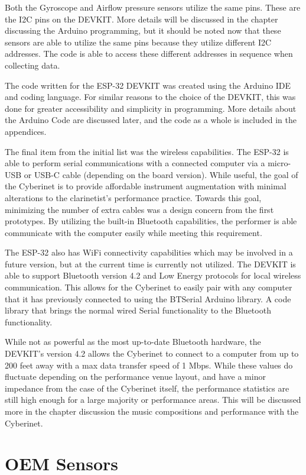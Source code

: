 Both the Gyroscope and Airflow pressure sensors utilize the same pins. These are the I2C pins on the DEVKIT. More details will be discussed in the chapter discussing the Arduino programming, but it should be noted now that these sensors are able to utilize the same pins because they utilize different I2C addresses. The code is able to access these different addresses in sequence when collecting data.

The code written for the ESP-32 DEVKIT was created using the Arduino IDE and coding language. For similar reasons to the choice of the DEVKIT, this was done for greater accessibility and simplicity in programming. More details about the Arduino Code are discussed later, and the code as a whole is included in the appendices.

The final item from the initial list was the wireless capabilities. The ESP-32 is able to perform serial communications with a connected computer via a micro-USB or USB-C cable (depending on the board version). While useful, the goal of the Cyberinet is to provide affordable instrument augmentation with minimal alterations to the clarinetist's performance practice. Towards this goal, minimizing the number of extra cables was a design concern from the first prototypes. By utilizing the built-in Bluetooth capabilities, the performer is able communicate with the computer easily while meeting this requirement.

The ESP-32 also has WiFi connectivity capabilities which may be involved in a future version, but at the current time is currently not utilized. The DEVKIT is able to support Bluetooth version 4.2 and Low Energy protocols for local wireless communication. This allows for the Cyberinet to easily pair with any computer that it has previously connected to using the BTSerial Arduino library. A code library that brings the normal wired Serial functionality to the Bluetooth functionality.

While not as powerful as the most up-to-date Bluetooth hardware, the DEVKIT's version 4.2 allows the Cyberinet to connect to a computer from up to 200 feet away with a max data transfer speed of 1 Mbps. While these values do fluctuate depending on the performance venue layout, and have a minor impedance from the case of the Cyberinet itself, the performance statistics are still high enough for a large majority or performance areas. This will be discussed more in the chapter discussion the music compositions and performance with the Cyberinet.

\section{OEM Sensors}
